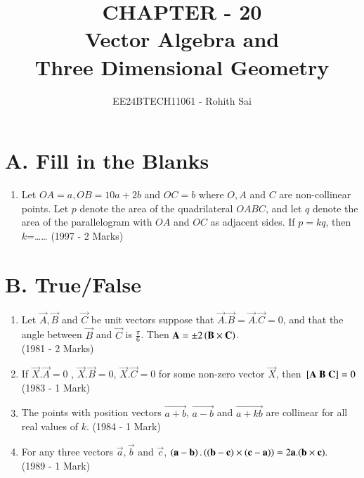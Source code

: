 \documentclass[journal,12pt,twocolumn]{IEEEtran}
\theoremstyle{remark}
\begin{document}

\vspace{3cm}

\title{CHAPTER - 20\\Vector Algebra and\\Three Dimensional Geometry}
\author{EE24BTECH11061 - Rohith Sai}
\maketitle
\newpage
\bigskip

\renewcommand{\thefigure}{\theenumi}
\renewcommand{\thetable}{\theenumi}

\section{A. Fill in the Blanks}
\begin{enumerate}
\item Let $OA=a, OB = 10a + 2b$ and $OC =b$ where $O, A$ and $C$ are non-collinear points. Let $p$ denote the area of the quadrilateral $OABC$, and let $q$ denote the area of the parallelogram with $OA$ and $OC$ as adjacent sides. If $p=kq$, then $k$=\dots\dots
\hfill (1997 - 2 Marks)
\end{enumerate}

\section{B. True/False}
\begin{enumerate}
\item Let $\vec{A}, \vec{B}$ and $\vec{C}$ be unit vectors suppose that $\vec{A}.\vec{B} = \vec{A}.\vec{C}=0$, and that the angle between $\vec{B}$ and $\vec{C}$ is $\frac{\pi}{6}$. Then $\mathbf{A}=\pm2\left(\mathbf{B}\times\mathbf{C}\right)$.\\
\hfill (1981 - 2 Marks)

\item If $\vec{X}.\vec{A}=0$ , $\vec{X}.\vec{B}=0$, $\vec{X}.\vec{C}=0$ for some non-zero vector $\vec{X}$, then $\sbrak{\vec{A}\ \vec{B}\ \vec{C}}=0$\\
\hfill (1983 - 1 Mark)

\item The points with position vectors $\vec{a+b}$, $\vec{a-b}$ and $\vec{a+kb}$ are collinear for all real values of $k$.
\hfill (1984 - 1 Mark)

\item For any three vectors $\vec{a}, \vec{b}$ and $\vec{c}$, $\left(\mathbf{a}-\mathbf{b}\right).\left({\left(\mathbf{b}-\mathbf{c)}\times(\mathbf{c}-\mathbf{a}\right)}\right) = 2\mathbf{a}.(\mathbf{b}\times\mathbf{c}).$\\
\hfill (1989 - 1 Mark)
\end{enumerate}
\end{document}
